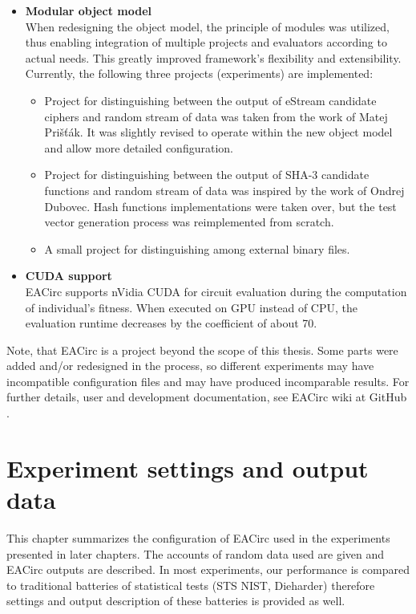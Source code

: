 \documentclass[12pt,oneside]{fithesis2}
\newcommand{\squarebullet}{\textcolor{black}{\raisebox{0.15em}{\rule{4pt}{4pt}}}}
\newenvironment{myItemize}{
  \begin{itemize}[leftmargin=2em,rightmargin=1em,itemsep=\parskip ,parsep=0em,topsep=0em,partopsep=0em]
  \renewcommand{\labelitemi}{\squarebullet}
  \renewcommand{\labelitemii}{$\diamond$}
}{
  \end{itemize}
}
\begin{document}
\begin{myItemize}
\item \textbf{Modular object model}\\
When redesigning the object model, the principle of modules was utilized, thus enabling integration of multiple projects 
and evaluators according to actual needs. This greatly improved framework's flexibility and extensibility.
Currently, the following three projects (experiments) are implemented:
\begin{myItemize}
\item Project for distinguishing between the output of eStream candidate ciphers and random stream of data was taken from the work of 
Matej Prišťák.
It was slightly revised to operate within the new object model and allow more detailed configuration.
\item Project for distinguishing between the output of SHA-3 candidate functions and random stream of data was inspired by the work of 
Ondrej Dubovec.
Hash functions implementations were taken over, but the test vector generation process was reimplemented from scratch. 
\item A small project for distinguishing among external binary files.
\end{myItemize}
\item \textbf{CUDA support}\\
EACirc supports nVidia CUDA for circuit evaluation during the computation of individual's fitness.
When executed on GPU instead of CPU, the evaluation runtime decreases by the coefficient of about 70.
\end{myItemize}

\noindent
Note, that EACirc is a project beyond the scope of this thesis. Some parts were added and/or redesigned in the process, so
different experiments may have incompatible configuration files and may have produced incomparable results.
For further details, user and development documentation, see EACirc wiki at GitHub \parencite{eacirc-github}.	

\chapter{Experiment settings and output data}
\label{chap:settings}

This chapter summarizes the configuration of EACirc used in the experiments presented in later chapters.
The accounts of random data used are given and EACirc outputs are described. 
In most experiments, our performance is compared to traditional batteries of statistical tests (STS NIST, Dieharder)
therefore settings and output description of these batteries is provided as well.
\end{document}
